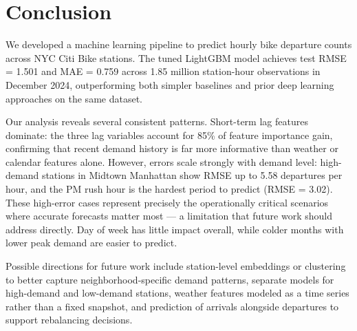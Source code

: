 \documentclass{article}
\begin{document}
\section{Conclusion}

We developed a machine learning pipeline to predict hourly bike departure counts
across NYC Citi Bike stations. The tuned LightGBM model achieves test RMSE =
1.501 and MAE = 0.759 across 1.85 million station-hour observations in December
2024, outperforming both simpler baselines and prior deep learning approaches on
the same dataset.

Our analysis reveals several consistent patterns. Short-term lag features
dominate: the three lag variables account for 85\% of feature importance gain,
confirming that recent demand history is far more informative than weather or
calendar features alone. However, errors scale strongly with demand level:
high-demand stations in Midtown Manhattan show RMSE up to 5.58 departures per
hour, and the PM rush hour is the hardest period to predict (RMSE = 3.02).
These high-error cases represent precisely the operationally critical
scenarios where accurate forecasts matter most --- a limitation that future
work should address directly. Day of week has little impact overall, while
colder months with lower peak demand are easier to predict.

Possible directions for future work include station-level embeddings or
clustering to better capture neighborhood-specific demand patterns, separate
models for high-demand and low-demand stations, weather features modeled as a
time series rather than a fixed snapshot, and prediction of arrivals alongside
departures to support rebalancing decisions.



\end{document}
